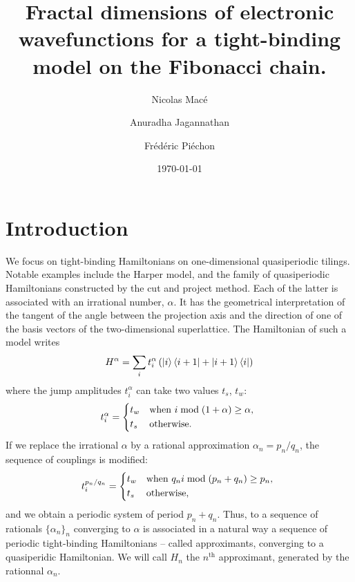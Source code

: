 \documentclass[aps,prl,preprint]{revtex4-1}
\begin{document}
\title{Fractal dimensions of electronic wavefunctions for a tight-binding model on the Fibonacci chain.}
\author{Nicolas Macé}
\author{Anuradha Jagannathan}
\author{Frédéric Piéchon}


\date{\today}

\begin{abstract}
\end{abstract}

\maketitle

\section*{Introduction}
We focus on tight-binding Hamiltonians on one-dimensional quasiperiodic tilings.
Notable examples include the Harper model, and the family of quasiperiodic Hamiltonians constructed by the cut and project method. 
Each of the latter is associated with an irrational number, $\alpha$.
It has the geometrical interpretation of the tangent of the angle between the projection axis and the direction of one of the basis vectors of the two-dimensional superlattice.
The Hamiltonian of such a model writes
\begin{equation}
	H^\alpha = \sum_i t^\alpha_i \left( \ket{i} \bra{i+1} + \ket{i+1} \bra{i} \right)
\end{equation}
where the jump amplitudes $t^\alpha_i$ can take two values $t_s$, $t_w$:
\begin{equation}
	t_i^\alpha = \begin{dcases*}
	t_w & when $i \bmod(1+\alpha) \geq \alpha$, \\
	t_s & otherwise.
	\end{dcases*}
\end{equation}
If we replace the irrational $\alpha$ by a rational approximation $\alpha_n = p_n/q_n$, the sequence of couplings is modified:
\begin{equation}
	t_i^{p_n/q_n} = \begin{dcases*}
	t_w & when $q_n i \bmod(p_n+q_n) \geq p_n$, \\
	t_s & otherwise,
	\end{dcases*}
\end{equation}
and we obtain a periodic system of period $p_n + q_n$. 
Thus, to a sequence of rationals $\{\alpha_n\}_n$ converging to $\alpha$ is associated in a natural way a sequence of periodic tight-binding Hamiltonians -- called approximants, converging to a quasiperidic Hamiltonian. We will call $H_n$ the $n^\text{th}$ approximant, generated by the rationnal $\alpha_n$.
\end{document}
